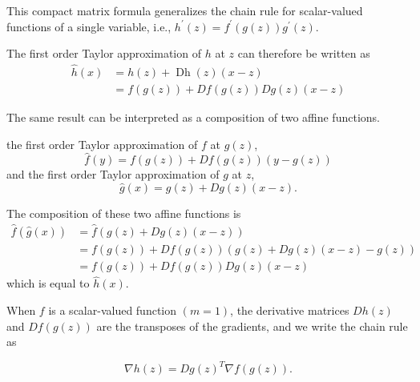 This compact matrix formula generalizes the chain rule for scalar-valued functions of a single variable, i.e., $ h^{\prime}(z)=f^{\prime}(g(z)) g^{\prime}(z) $.

\begin{corollary}
    The first order Taylor approximation of $ h $ at $ z $ can therefore be written as
\begin{equation}
\begin{aligned}
\hat{h}(x) &=h(z)+\operatorname{Dh}(z)(x-z) \\
&=f(g(z))+D f(g(z)) D g(z)(x-z)
\end{aligned}
\end{equation}
\end{corollary}



The same result can be interpreted as a composition of two affine functions.


\begin{theorem}
    the first order Taylor approximation of $ f $ at $ g(z) $,
    \begin{equation}
    \hat{f}(y)=f(g(z))+D f(g(z))(y-g(z))
    \end{equation}
    and the first order Taylor approximation of $ g $ at $ z $,
    \begin{equation}
    \hat{g}(x)=g(z)+D g(z)(x-z) .
    \end{equation}

    The composition of these two affine functions is
\begin{equation}
\begin{aligned}
\hat{f}(\hat{g}(x)) &=\hat{f}(g(z)+D g(z)(x-z)) \\
&=f(g(z))+D f(g(z))(g(z)+D g(z)(x-z)-g(z)) \\
&=f(g(z))+D f(g(z)) D g(z)(x-z)
\end{aligned}
\end{equation}
which is equal to $ \hat{h}(x) $.
\end{theorem}


When $ f $ is a scalar-valued function $ (m=1) $, the derivative matrices $ D h(z) $ and $ D f(g(z)) $ are the transposes of the gradients, and we write the chain rule as

\begin{theorem}
    \begin{equation}
\nabla h(z)=D g(z)^{T} \nabla f(g(z)) .
\end{equation}
\end{theorem}


